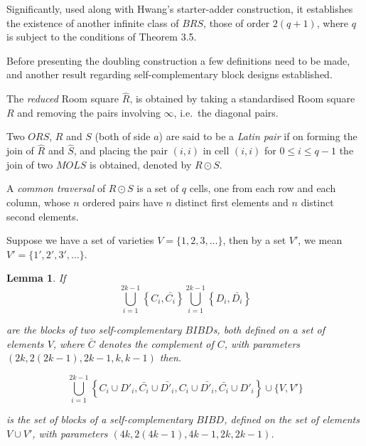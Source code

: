 \documentclass[
  11pt,
  a4paper]{book}
\newtheorem{lemma}[theorem]{Lemma}
\begin{document}
Significantly, used along with Hwang's starter-adder
construction, it establishes the existence of another
infinite class of \(BRS\), those of order \(2(q+1)\), where \(q\)
is subject to the conditions of Theorem 3.5.

Before presenting the doubling construction a few
definitions need to be made, and another result regarding
self-complementary block designs established.

The \emph{reduced} Room square \(\hat{R}\), is obtained by taking a
standardised Room square \(R\) and removing the pairs
involving \(\infty\), i.e.~the diagonal pairs.

Two \(ORS\), \(R\) and \(S\) (both of side \(a\)) are said to be a
\emph{Latin pair} if on forming the join of \(\hat{R}\) and
\(\hat{S}\), and placing the pair \((i, i)\) in cell \((i, i)\) for
\(0 \leq i \leq q - 1\) the join of two \(MOLS\) is obtained,
denoted by \(R \odot S\).

A \emph{common traversal} of \(R \odot S\) is a set of \(q\) cells,
one from each row and each column, whose \(n\) ordered pairs
have \(n\) distinct first elements and \(n\) distinct second
elements.

Suppose we have a set of varieties \(V = \{1, 2, 3, \ldots\}\), then
by a set \(V'\), we mean \(V'=\{1', 2', 3', \ldots\}\).

\begin{lemma}
If
\begin{equation}
  \bigcup\limits_{i=1}^{2k-1} \left \{C_i,\bar{C_i} \right \} 
  \bigcup\limits_{i=1}^{2k-1} \left \{D_i,\bar{D_i} \right \}
\end{equation}

are the blocks of two self-complementary $BIBD$s, both
defined on a set of elements $V$, where $\bar{C}$ denotes
the complement of $C$, with parameters
$(2k, 2(2k - 1), 2k - 1, k, k-1)$ then.

\begin{equation}
\bigcup\limits_{i=1}^{2k-1} \left \{C_i \cup D'_i, \bar{C_i} \cup \bar{D'_i}, C_i \cup \bar{D'_i}, \bar{C_i} \cup D'_i  \right \} \cup \{V,V'\}
\end{equation}

is the set of blocks of a self-complementary $BIBD$, defined
on the set of elements $V \cup V'$, with parameters
$(4k, 2(4k - 1), 4k - 1, 2k, 2k - 1)$.
\end{lemma}
\end{document}
